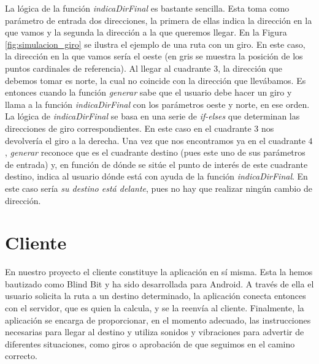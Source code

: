 La lógica de la función \textit{indicaDirFinal} es bastante sencilla. Esta toma como parámetro de entrada dos direcciones, la primera de ellas indica la dirección en la que vamos y la segunda la dirección a la que queremos llegar. En la Figura \ref{fig:simulacion_giro} se ilustra el ejemplo de una ruta con un giro. En este caso, la dirección en la que vamos sería el oeste (en gris se muestra la posición de los puntos cardinales de referencia). Al llegar al cuadrante $3$, la dirección que debemos tomar es norte, la cual no coincide con la dirección que llevábamos. Es entonces cuando la función \textit{generar} sabe que el usuario debe hacer un giro y llama a la función \textit{indicaDirFinal} con los parámetros oeste y norte, en ese orden. La lógica de \textit{indicaDirFinal} se basa en una serie de \textit{if-elses} que determinan las direcciones de giro correspondientes. En este caso en el cuadrante $3$ nos devolvería el giro a la derecha. Una vez que nos encontramos ya en el cuadrante $4$, \textit{generar} reconoce que es el cuadrante destino (pues este uno de sus parámetros de entrada) y, en función de dónde se sitúe el punto de interés de este cuadrante destino, indica al usuario dónde está con ayuda de la función \textit{indicaDirFinal}. En este caso sería \textit{su destino está delante}, pues no hay que realizar ningún cambio de dirección. 






\section{Cliente}
\label{sec:cliente}
En nuestro proyecto el cliente constituye la aplicación en sí misma. Esta la hemos bautizado como Blind Bit y ha sido desarrollada para Android. A través de ella el usuario solicita la ruta a un destino determinado, la aplicación conecta entonces con el servidor, que es quien la calcula, y se la reenvía al cliente. Finalmente, la aplicación se encarga de proporcionar, en el momento adecuado, las instrucciones necesarias para llegar al destino y utiliza sonidos y vibraciones para advertir de diferentes situaciones, como giros o aprobación de que seguimos en el camino correcto.

